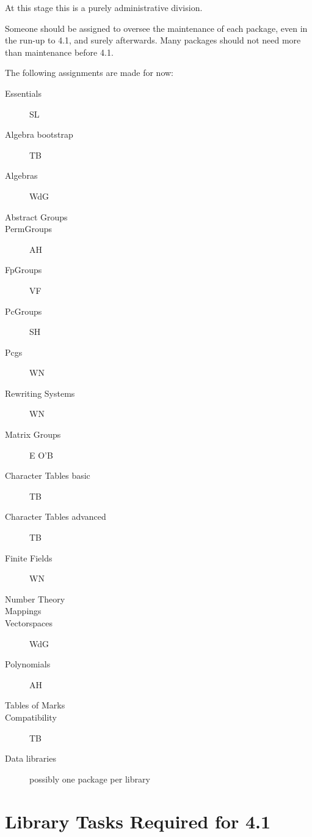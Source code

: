 \documentclass[12pt]{article}
\newcommand{\bd}{\begin{description}}
\newcommand{\ed}{\end{description}}
\begin{document}
At this stage this is a purely administrative division. 

Someone should be assigned to oversee the maintenance of each package,
even in the run-up to 4.1, and surely afterwards. Many packages should
not need more than maintenance before 4.1.

The following assignments are made for now:
\bd
\item[Essentials] SL
\item[Algebra bootstrap] TB
\item[Algebras] WdG
\item[Abstract Groups] 
\item[PermGroups] AH
\item[FpGroups] VF
\item[PcGroups] SH
\item[Pcgs] WN
\item[Rewriting Systems] WN
\item[Matrix Groups]  E O'B
\item[Character Tables basic] TB
\item[Character Tables advanced] TB 
\item[Finite Fields] WN
\item[Number Theory] 
\item[Mappings]
\item[Vectorspaces]  WdG
\item[Polynomials] AH
\item[Tables of Marks]
\item[Compatibility] TB
\item[Data libraries] possibly one package per library
\ed

\section{Library Tasks Required for 4.1}
\end{document}
